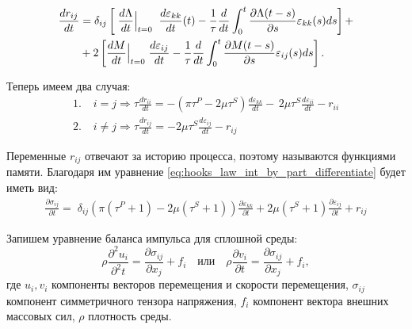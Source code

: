 \documentclass[a4paper, fontsize=14pt]{article}
\begin{document}
\begin{equation*}
    \begin{aligned}
        \frac{d r_{ij}}{dt} &= \delta_{ij} \left[\; \frac{d \Lambda}{d t}\Big{|}_{t = 0} \;  \; \frac{d \varepsilon_{kk}}{dt}  (t) - \frac{1}{\tau} \frac{d}{dt} \int_0^t \frac{\partial \Lambda(t - s)}{\partial s} \varepsilon_{kk}(s) ds \right] + \\ 
           & + 2 \left[\frac{d M}{d t}\Big{|}_{t = 0} \; \frac{d \varepsilon_{ij}}{dt}  - \frac{1}{\tau} \frac{d}{dt} \int_0^t \frac{\partial M(t - s)}{\partial s} \varepsilon_{ij}(s) ds \right].
    \end{aligned}
\end{equation*}

Теперь имеем два случая:
\begin{equation}
    \label{eq:memory_funct}
    \begin{aligned}
        1.& \; i = j \Rightarrow \tau \frac{dr_{ii}}{dt} =  -  \left(\pi \tau^P - 2 \mu \tau^S \right) \frac{d \varepsilon_{kk}}{dt} -\, 2\mu \tau^S \frac{d \varepsilon_{ii}}{dt} -  r_{ii} \\
        2.& \; i \neq j \Rightarrow \tau \frac{dr_{ij}}{dt} = - 2 \mu \tau^S \frac{d \varepsilon_{ij}}{dt} - r_{ij} 
    \end{aligned}
\end{equation}

Переменные $r_{ij}$ отвечают за историю процесса, поэтому называются функциями памяти. Благодаря им уравнение \eqref{eq:hooks_law_int_by_part_differentiate} будет иметь вид:
\begin{equation}
    \label{eq:hooks_law_final}
    \begin{aligned}
        \frac{\partial \sigma_{ij}}{\partial t}  = \; \delta_{ij} \left(\pi (\tau^P + 1) - 2 \mu (\tau^S + 1) \right)  \frac{\partial \varepsilon_{kk}}{\partial t} + 2 \mu (\tau^S + 1)  \frac{\partial \varepsilon_{ij}}{\partial t} + r_{ij}
    \end{aligned}
\end{equation}

Запишем уравнение баланса импульса для сплошной среды: 
\begin{equation}
    \label{eq:newton_law}
    \rho \frac{\partial^2 u_{i}}{\partial^2 t} = \frac{\partial \sigma_{ij}}{\partial x_j}  + f_{i} \quad \text{или} \quad \rho \frac{\partial v_{i}}{\partial t}  = \frac{\partial \sigma_{ij}}{\partial x_j}  + f_{i},
\end{equation}
где $u_{i}, v_{i}$ компоненты векторов перемещения и скорости перемещения, $\sigma_{ij}$ компонент симметричного тензора напряжения, $f_i$ компонент вектора внешних массовых сил, $\rho$ плотность среды.
\end{document}
